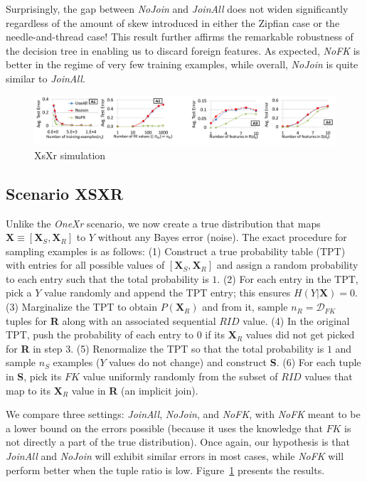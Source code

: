 \documentclass[sigconf]{acmart}
\begin{document}
Surprisingly, the gap between \textit{NoJoin} and \textit{JoinAll} does not widen significantly regardless of the amount of skew introduced in either the Zipfian case or
the needle-and-thread case! This result further affirms the remarkable robustness of the decision tree in enabling us to discard foreign features. As expected, 
\textit{NoFK} is better in the regime of very few training examples, while overall, \textit{NoJoin} is quite similar to \textit{JoinAll}.


\begin{figure}
\centering
\includegraphics[width=2\columnwidth,height=\textheight,keepaspectratio]{xsxr.png}
\caption{XsXr simulation}
\label{Figure:XsXrSimulation}
\end{figure}

\subsection{Scenario XSXR}
Unlike the \textit{OneXr} scenario, we now create a true distribution that maps $\textbf{X} \equiv [\textbf{X}_S, \textbf{X}_R]$ to $Y$ without any Bayes error (noise).
The exact procedure for sampling examples is as follows: (1) Construct a true probability table (TPT) with entries for all possible values of 
$[\textbf{X}_S, \textbf{X}_R]$ and assign a random probability to each entry such that the total probability is $1$.
(2) For each entry in the TPT, pick a $Y$ value randomly and append the TPT entry; this ensures $H(Y|\textbf{X}) = 0$.
(3) Marginalize the TPT to obtain $P(\textbf{X}_R)$ and from it, sample $n_R = \mathcal{D}_{FK}$ tuples for \textbf{R} along with an associated sequential $RID$ value.
(4) In the original TPT, push the probability of each entry to $0$ if its $\textbf{X}_R$ values did not get picked for \textbf{R} in step 3.
(5) Renormalize the TPT so that the total probability is $1$ and sample $n_S$ examples ($Y$ values do not change) and construct \textbf{S}.
(6) For each tuple in \textbf{S}, pick its $FK$ value uniformly randomly from the subset of $RID$ values that map to its $\textbf{X}_R$ value in \textbf{R} (an implicit join).

We compare three settings: \textit{JoinAll}, \textit{NoJoin}, and \textit{NoFK}, with \textit{NoFK} meant to be a lower bound on the errors possible (because 
it uses the knowledge that $FK$ is not directly a part of the true distribution). Once again, our hypothesis is that \textit{JoinAll} and \textit{NoJoin} will exhibit similar 
errors in most cases, while \textit{NoFK} will perform better when the tuple ratio is low. Figure~\ref{Figure:XsXrSimulation} presents the results.
\end{document}
